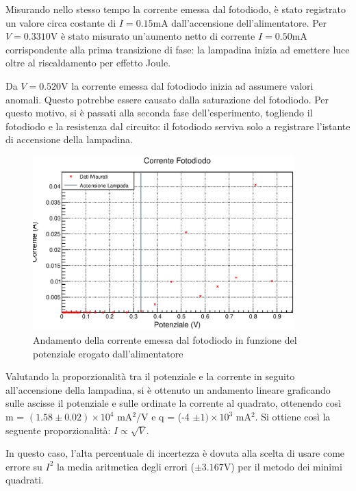 \documentclass[a4paper]{article}
\begin{document}
Misurando nello stesso tempo la corrente emessa dal fotodiodo, è stato registrato un valore circa costante di $I=0.15$mA dall'accensione dell'alimentatore. Per $V=0.3310$V è stato misurato un'aumento netto di corrente $I=0.50$mA corrispondente alla prima transizione di fase: la lampadina inizia ad emettere luce oltre al riscaldamento per effetto Joule. 

Da $V=0.520$V la corrente emessa dal fotodiodo inizia ad assumere valori anomali. Questo potrebbe essere causato dalla saturazione del fotodiodo. Per questo motivo, si è passati alla seconda fase dell'esperimento, togliendo il fotodiodo e la resistenza dal circuito: il fotodiodo serviva solo a registrare l'istante di accensione della lampadina. 

\begin{figure}[!htbp]
  \centering
      \includegraphics[width=0.9\textwidth]{immagini/fotodiodografico.eps}
        \caption{Andamento della corrente emessa dal fotodiodo in funzione del potenziale erogato dall'alimentatore}
\end{figure}
\FloatBarrier

Valutando la proporzionalità tra il potenziale e la corrente in seguito all'accensione della lampadina, si è ottenuto un andamento lineare graficando sulle ascisse il potenziale e sulle ordinate la corrente al quadrato, ottenendo così m = $(1.58\pm0.02) \times 10^4$ mA$^2$/V e q = (-4 $\pm 1) \times 10^3$ mA$^2$. Si ottiene così la seguente proporzionalità: $I\propto \sqrt{V}$.

In questo caso, l'alta percentuale di incertezza è dovuta alla scelta di usare come errore su $I^2$ la media aritmetica degli errori ($\pm 3.167$V) per il metodo dei minimi quadrati. 
\end{document}
